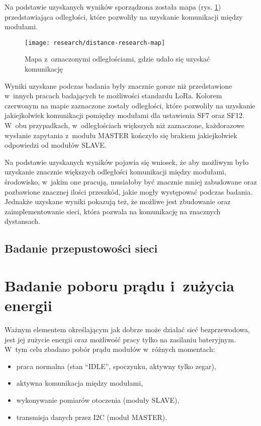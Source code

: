 Na podstawie uzyskanych wyników sporządzona została mapa (rys. \ref{img:distance-research-map}) przedstawiająca
odległości, które pozwoliły na uzyskanie komunikacji między modułami.

\begin{figure}[!htbp]
    \centering
    \texttt{[image: research/distance-research-map]}
    \caption{\label{img:distance-research-map}Mapa z~oznaczonymi odległościami, gdzie udało się uzyskać komunikację}
\end{figure}

\FloatBarrier
Wyniki uzyskane podczas badania były znacznie gorsze niż przedstawione w~innych pracach badających te możliwości
standardu LoRa. Kolorem czerwonym na mapie zaznaczone zostały odległości, które pozwoliły na uzyskanie jakiejkolwiek
komunikacji pomiędzy modułami dla ustawienia SF7 oraz SF12. W~obu przypadkach, w~odległościach większych niż zaznaczone,
każdorazowe wysłanie zapytania z~modułu MASTER kończyło się brakiem jakiejkolwiek odpowiedzi od modułów SLAVE.

Na podstawie uzyskanych wyników pojawia się wniosek, że aby możliwym było uzyskanie znacznie większych odległości
komunikacji między modułami, środowisko, w~jakim one pracują, musiałoby być znacznie mniej zabudowane oraz pozbawione
znacznej ilości przeszkód, jakie mogły występować podczas badania. Jednakże uzyskane wyniki pokazują też, że możliwe
jest zbudowanie oraz zaimplementowanie sieci, która pozwala na komunikację na znacznych dystansach.

\subsection{\label{sect:network-communication-bitrate}Badanie przepustowości sieci}

\FloatBarrier

\section{\label{sect:network-power-params}Badanie poboru prądu i~zużycia energii} Ważnym elementem określającym jak
dobrze może działać sieć bezprzewodowa, jest jej zużycie energii oraz możliwość pracy tylko na zasilaniu bateryjnym.
W~tym celu zbadano pobór prądu modułów w~różnych momentach:
\begin{itemize}[label=--]
    \item praca normalna (stan \enquote{IDLE}, spoczynku, aktywny tylko zegar),
    \item aktywna komunikacja między modułami,
    \item wykonywanie pomiarów otoczenia (moduły SLAVE),
    \item transmisja danych przez I2C (moduł MASTER).
\end{itemize}

